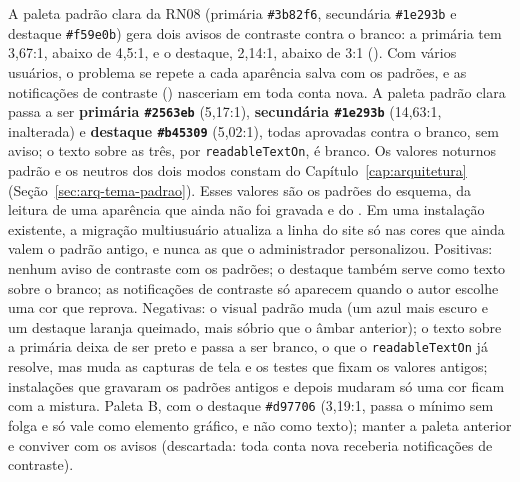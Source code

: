 {A paleta padrão clara da RN08 (primária \texttt{\#3b82f6}, secundária \texttt{\#1e293b} e destaque \texttt{\#f59e0b}) gera dois avisos de contraste contra o branco: a primária tem 3,67:1, abaixo de 4,5:1, e o destaque, 2,14:1, abaixo de 3:1 (). Com vários usuários, o problema se repete a cada aparência salva com os padrões, e as notificações de contraste () nasceriam em toda conta nova.}
{A paleta padrão clara passa a ser \textbf{primária \texttt{\#2563eb}} (5,17:1), \textbf{secundária \texttt{\#1e293b}} (14,63:1, inalterada) e \textbf{destaque \texttt{\#b45309}} (5,02:1), todas aprovadas contra o branco, sem aviso; o texto sobre as três, por \texttt{readableTextOn}, é branco. Os valores noturnos padrão e os neutros dos dois modos constam do Capítulo~\ref{cap:arquitetura} (Seção~\ref{sec:arq-tema-padrao}). Esses valores são os padrões do esquema, da leitura de uma aparência que ainda não foi gravada e do . Em uma instalação existente, a migração multiusuário atualiza a linha do site só nas cores que ainda valem o padrão antigo, e nunca as que o administrador personalizou.}
{Positivas: nenhum aviso de contraste com os padrões; o destaque também serve como texto sobre o branco; as notificações de contraste só aparecem quando o autor escolhe uma cor que reprova. Negativas: o visual padrão muda (um azul mais escuro e um destaque laranja queimado, mais sóbrio que o âmbar anterior); o texto sobre a primária deixa de ser preto e passa a ser branco, o que o \texttt{readableTextOn} já resolve, mas muda as capturas de tela e os testes que fixam os valores antigos; instalações que gravaram os padrões antigos e depois mudaram só uma cor ficam com a mistura.}
{Paleta B, com o destaque \texttt{\#d97706} (3,19:1, passa o mínimo sem folga e só vale como elemento gráfico, e não como texto); manter a paleta anterior e conviver com os avisos (descartada: toda conta nova receberia notificações de contraste).}

